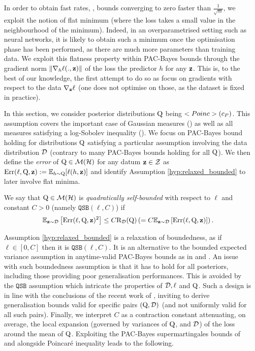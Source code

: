 In order to obtain fast rates, \ie, bounds converging to zero faster than $\frac{1}{\sqrt{m}}$,  we exploit the notion of flat minimum (where the loss takes a small value in the neighbourhood of the minimum).
Indeed, in an overparametrised setting such as neural networks, it is likely to obtain such a minimum once the optimisation phase has been performed, as there are much more parameters than training data.
We exploit this flatness property within PAC-Bayes bounds through the gradient norm $\| \nabla_h \ell(.,\mathbf{z})\|$ of the loss \wrt the predictor $h$ for any $\mathbf{z}$.
This is, to the best of our knowledge, the first attempt to do so as \citet{gat2022grad} focus on gradients with respect to the data $\nabla_{\mathbf{z}}\ell$ (one does not optimise on those, as the dataset is fixed in practice).
  
In this section, we consider posterior distributions $\mathrm{Q}$ being $<Poinc>(c_P)$.
This assumption covers the important case of Gaussian measures () as well as all measures satisfying a log-Sobolev inequality ().
We focus on PAC-Bayes bound holding for distributions $\mathrm{Q}$ satisfying a particular assumption involving the data distribution $\mathcal{D}$ (contrary to many PAC-Bayes bounds holding for all $\mathrm{Q}$).
We then define the \emph{error} of $\mathrm{Q}\in \mathcal{M}(\mathcal{H})$ for any datum $\mathbf{z}\in\mathcal{Z}$ as $\operatorname*{\mathrm{Err}}(\ell,\mathrm{Q},\mathbf{z}):= \mathbb{E}_{h\sim\mathrm{Q}}[\ell(h,\mathbf{z})]$ and identify Assumption \ref{hyp:relaxed_bounded} to later involve flat minima.

  
  \begin{assumption}
    \label{hyp:relaxed_bounded}
    We say that $\mathrm{Q}\in\mathcal{M}(\mathcal{H})$ is \emph{quadratically self-bounded} with respect to $\ell$ and constant $C>0$ (namely $\texttt{QSB}(\ell,C)$) if
    \[ \mathbb{E}_{\mathbf{z}\sim \mathcal{D}}\left[ \operatorname*{\mathrm{Err}}(\ell,\mathrm{Q},\mathbf{z})^2 \right] \leq C \text{R}_{\mathcal{D}}(\mathrm{Q}) \left( = C\mathbb{E}_{\mathbf{z}\sim \mathcal{D}}\left[ \operatorname*{\mathrm{Err}}(\ell,\mathrm{Q},\mathbf{z}) \right] \right).   \]
  \end{assumption}
Assumption \ref{hyp:relaxed_bounded} is a relaxation of boundedness, as if $\ell\in[0,C]$ then it is $\texttt{QSB}(\ell,C)$.
It is an alternative to the bounded expected variance assumption in anytime-valid PAC-Bayes bounds as in  and \citep{chugg2023unified}.
An issue with such boundedness assumption is that it has to hold for all posteriors, including those providing poor generalisation performances.
This is avoided by the $\texttt{QSB}$ assumption which intricate the properties of $\mathcal{D},\ell$ and $\mathrm{Q}$.
Such a design is in line with the conclusions of the recent work of \citet{gastpar2023fantastic}, inviting to derive generalisation bounds valid for specific pairs $(\mathrm{Q},\mathcal{D})$ (and not uniformly valid for all such pairs).
Finally, we interpret $C$ as a contraction constant attenuating, on average, the local expansion (governed by variances of $\mathrm{Q}$, and $\mathcal{D}$) of the loss around the mean of $\mathrm{Q}$.
Exploiting the PAC-Bayes supermartingales bounds of  and \citet{chugg2023unified} alongside Poincaré inequality leads to the following. 

